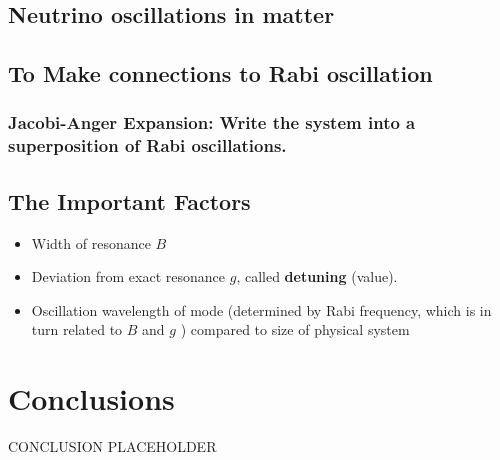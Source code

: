 \documentclass[%
preprint,
 amsmath,amssymb,
 aps,
]{revtex4-1}
\begin{document}
\subsection{Neutrino oscillations in matter}



\subsection{To Make connections to Rabi oscillation}



\subsubsection{Jacobi-Anger Expansion: Write the system into a superposition of Rabi oscillations.}
    
    




    

\subsection{The Important Factors}



\begin{itemize}
            \item Width of resonance $B$
            \item Deviation from exact resonance $g$, called {\bf{detuning}} (value).
            \item Oscillation wavelength of mode (determined by Rabi frequency, which is in turn related to $B$ and $g$ ) compared to size of physical system
\end{itemize}







\section{\label{conclusions}Conclusions}


CONCLUSION PLACEHOLDER





 



\end{document}
